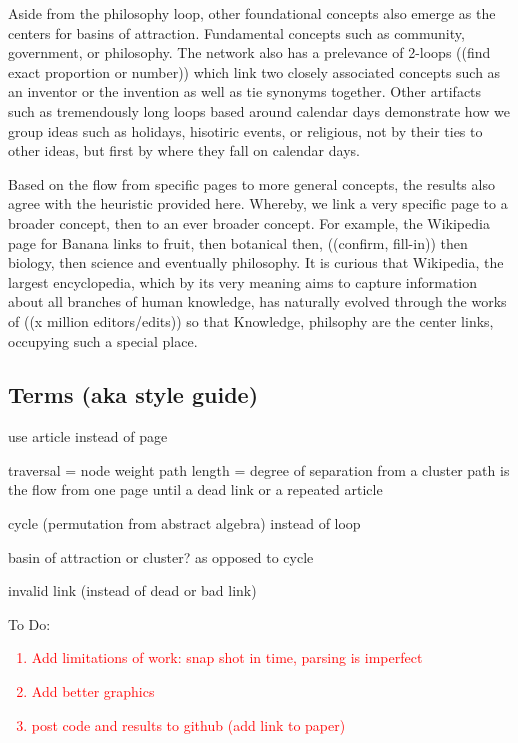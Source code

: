 \documentclass[twoside]{article}
\begin{document}
\begin{multicols}{2}
Aside from the philosophy loop, other foundational concepts also emerge as the centers for basins of attraction. Fundamental concepts such as community, government, or philosophy. The network also has a prelevance of 2-loops ((find exact proportion or number)) which link two closely associated concepts such as an inventor or the invention as well as tie synonyms together. Other artifacts such as tremendously long loops based around calendar days demonstrate how we group ideas such as holidays, hisotiric events, or religious, not by their ties to other ideas, but first by where they fall on calendar days. 


Based on the flow from specific pages to more general concepts, the results also agree with the heuristic provided here. Whereby, we link a very specific page to a broader concept, then to an ever broader concept. For example, the Wikipedia page for Banana links to fruit, then botanical then, ((confirm, fill-in)) then biology, then science and eventually philosophy. It is curious that Wikipedia, the largest encyclopedia, which by its very meaning aims to capture information about all branches of human knowledge, has naturally evolved through the works of ((x million editors/edits)) so that Knowledge, philsophy are the center links, occupying such a special place. 

\end{multicols}


\subsection{Terms (aka style guide)}

use article instead of page

traversal = node weight
path length = degree of separation from a cluster
path is the flow from one page until a dead link or a repeated article

cycle (permutation from abstract algebra) instead of loop

basin of attraction or cluster? as opposed to cycle

invalid link (instead of dead or bad link)


To Do:
\textcolor{red}{
\begin{enumerate}
    \item Add limitations of work: snap shot in time, parsing is imperfect
    \item Add better graphics
    \item post code and results to github (add link to paper)
\end{enumerate}}
\end{document}
